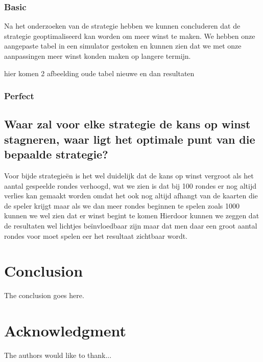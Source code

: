 \documentclass[conference]{IEEEtran}
\begin{document}
\subsubsection{Basic}
Na het onderzoeken van de strategie hebben we kunnen concluderen dat de strategie geoptimaliseerd kan worden om meer winst te maken.
We hebben onze aangepaste tabel in een simulator gestoken en kunnen zien dat we met onze aanpassingen meer winst konden maken op langere termijn.

hier komen 2 afbeelding oude tabel nieuwe en dan resultaten
\subsubsection{Perfect}

\subsection{ Waar zal voor elke strategie de kans op winst stagneren, waar ligt het optimale punt van die bepaalde strategie?}
Voor bijde strategieën is het wel duidelijk dat de kans op winst vergroot als het aantal gespeelde rondes verhoogd, wat we zien is dat bij 100 rondes er nog altijd verlies kan gemaakt worden omdat het ook nog altijd afhangt van de kaarten die de speler krijgt maar als we dan meer rondes beginnen te spelen zoals 1000 kunnen we wel zien dat er winst begint te komen Hierdoor kunnen we zeggen dat de resultaten wel lichtjes beïnvloedbaar zijn maar dat men daar een groot aantal rondes voor moet spelen eer het resultaat zichtbaar wordt. 
\section{Conclusion}
The conclusion goes here.

\section*{Acknowledgment}

The authors would like to thank...

\end{document}
